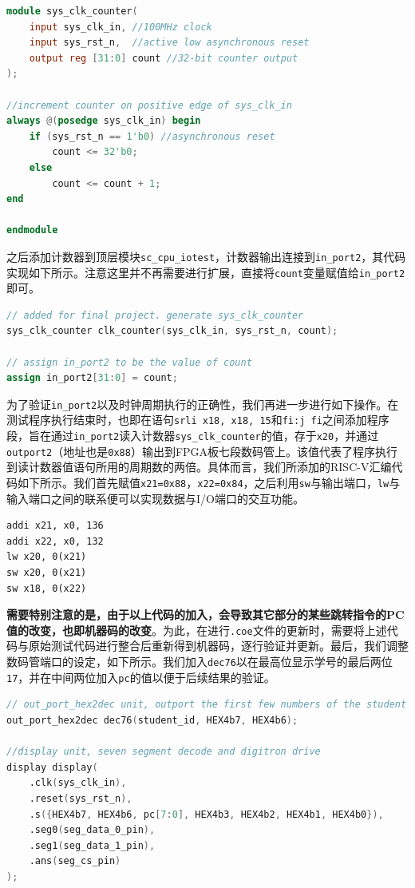 \documentclass[a4paper,12pt]{article}
\begin{document}
\begin{lstlisting}[language=verilog]
module sys_clk_counter(
    input sys_clk_in, //100MHz clock
    input sys_rst_n,  //active low asynchronous reset
    output reg [31:0] count //32-bit counter output
);

//increment counter on positive edge of sys_clk_in
always @(posedge sys_clk_in) begin
    if (sys_rst_n == 1'b0) //asynchronous reset
        count <= 32'b0;
    else
        count <= count + 1;
end

endmodule
\end{lstlisting}
    
    之后添加计数器到顶层模块\verb|sc_cpu_iotest|，计数器输出连接到\verb|in_port2|，其代码实现如下所示。注意这里并不再需要进行扩展，直接将\verb|count|变量赋值给\verb|in_port2|即可。
\begin{lstlisting}[language=verilog]
// added for final project. generate sys_clk_counter
sys_clk_counter clk_counter(sys_clk_in, sys_rst_n, count);

// assign in_port2 to be the value of count
assign in_port2[31:0] = count;
\end{lstlisting}

    为了验证\verb|in_port2|以及时钟周期执行的正确性，我们再进一步进行如下操作。在测试程序执行结束时，也即在语句\verb|srli x18, x18, 15|和\verb|fi:j fi|之间添加程序段，旨在通过\verb|in_port2|读入计数器\verb|sys_clk_counter|的值，存于\verb|x20|，并通过\verb|outport2|（地址也是\verb|0x88|）输出到FPGA板七段数码管上。该值代表了程序执行到读计数器值语句所用的周期数的两倍。具体而言，我们所添加的RISC-V汇编代码如下所示。我们首先赋值\verb|x21=0x88|，\verb|x22=0x84|，之后利用\verb|sw|与输出端口，\verb|lw|与输入端口之间的联系便可以实现数据与I/O端口的交互功能。

    \begin{lstlisting}
addi x21, x0, 136
addi x22, x0, 132
lw x20, 0(x21)
sw x20, 0(x21)
sw x18, 0(x22)
    \end{lstlisting}

    \textbf{需要特别注意的是，由于以上代码的加入，会导致其它部分的某些跳转指令的PC值的改变，也即机器码的改变}。为此，在进行\verb|.coe|文件的更新时，需要将上述代码与原始测试代码进行整合后重新得到机器码，逐行验证并更新。最后，我们调整数码管端口的设定，如下所示。我们加入\verb|dec76|以在最高位显示学号的最后两位\verb|17|，并在中间两位加入\verb|pc|的值以便于后续结果的验证。

    \begin{lstlisting}[language=verilog]
// out_port_hex2dec unit, outport the first few numbers of the student number
out_port_hex2dec dec76(student_id, HEX4b7, HEX4b6);

//display unit, seven segment decode and digitron drive 
display display(
    .clk(sys_clk_in),
    .reset(sys_rst_n),
    .s({HEX4b7, HEX4b6, pc[7:0], HEX4b3, HEX4b2, HEX4b1, HEX4b0}),
    .seg0(seg_data_0_pin),
    .seg1(seg_data_1_pin),
    .ans(seg_cs_pin)
);
    \end{lstlisting}
    
\end{document}
